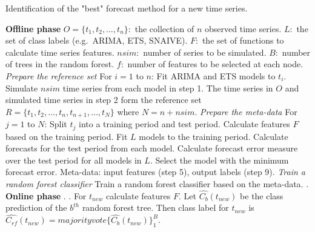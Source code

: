 \documentclass[11pt,a4paper,]{article}
\theoremstyle{definition}
\theoremstyle{definition}
\theoremstyle{definition}
\theoremstyle{remark}
\begin{document}
\begin{algorithm}[!ht]
  \caption{Identification of the "best" forecast method for a new time series.}
  \label{alg:algo-lab}
  \begin{algorithmic}[1]
    \Statex \textbf{Offline phase}
    \Statex {}
    \Statex \hspace{1cm}$O=\{t_1, t_2, \dots,t_n\}:$ the collection of $n$ observed time series.
      \Statex \hspace{1cm}$L:$ the set of class labels (e.g.\ ARIMA, ETS, SNAIVE).
         \Statex \hspace{1cm}$F:$ the set of functions to calculate time series features.
         \Statex \hspace{1cm}$nsim:$ number of series to be simulated.
         \Statex \hspace{1cm}$B:$ number of trees in the random forest.
         \Statex \hspace{1cm}$f:$ number of features to be selected at each node.
     \Statex {}
      \Statex \hspace{1cm} 
      \Statex
     \Statex \textit{Prepare the reference set}
    \Statex For $i=1$ to $n$:
            \State Fit ARIMA and ETS models to $t_i$.
            \State Simulate $nsim$ time series from each model in step 1.
            \State The time series in $O$ and simulated time series in step 2 form the reference set $R=\{t_1, t_2, \dots,t_n, t_{n+1},\dots,t_N\}$ where $N = n + nsim$.
    \Statex 
    \Statex \textit{Prepare the meta-data}
    \Statex For $j=1$ to $N$:
            \State Split $t_j$ into a training period and test period.
            \State Calculate features $F$ based on the training period. 
            \State Fit $L$ models to the training period.
            \State Calculate forecasts for the test period from each model.
            \State Calculate forecast error measure over the test period for all models in $L$.
            \State Select the model with the minimum forecast error.
            \State Meta-data: input features (step 5), output labels (step 9).
     \Statex
    \Statex \textit{Train a random forest classifier}
            \State Train a random forest classifier based on the meta-data.
            . 
    \Statex
     \Statex \textbf{Online phase}
    \Statex {}
    \Statex \hspace{1cm} .
     \Statex {}
      \Statex \hspace{1cm}.
  \State For $t_{new}$ calculate features $F$.
  \State Let $\hat{C_b}(t_{new})$ be the class prediction of the $b^{th}$ random forest tree. Then class label for $t_{new}$ is $\hat{C_{rf}}(t_{new})=majorityvote\{\hat{C_b}(t_{new})\}_1^B$.
   \end{algorithmic}
\end{algorithm}
\end{document}
